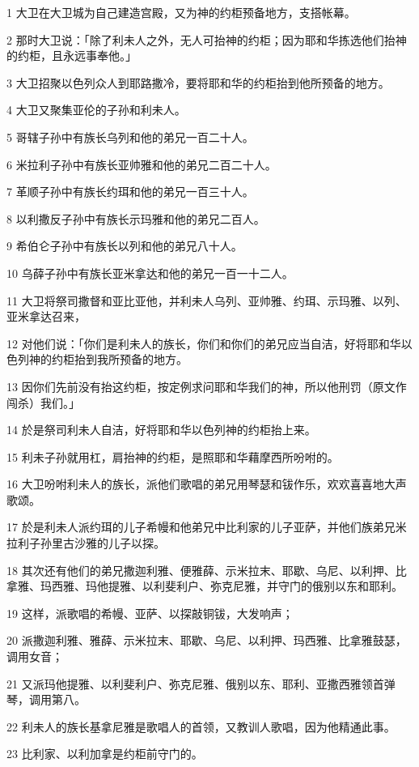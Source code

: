 \par 1 大卫在大卫城为自己建造宫殿，又为神的约柜预备地方，支搭帐幕。
\par 2 那时大卫说：「除了利未人之外，无人可抬神的约柜；因为耶和华拣选他们抬神的约柜，且永远事奉他。」
\par 3 大卫招聚以色列众人到耶路撒冷，要将耶和华的约柜抬到他所预备的地方。
\par 4 大卫又聚集亚伦的子孙和利未人。
\par 5 哥辖子孙中有族长乌列和他的弟兄一百二十人。
\par 6 米拉利子孙中有族长亚帅雅和他的弟兄二百二十人。
\par 7 革顺子孙中有族长约珥和他的弟兄一百三十人。
\par 8 以利撒反子孙中有族长示玛雅和他的弟兄二百人。
\par 9 希伯仑子孙中有族长以列和他的弟兄八十人。
\par 10 乌薛子孙中有族长亚米拿达和他的弟兄一百一十二人。
\par 11 大卫将祭司撒督和亚比亚他，并利未人乌列、亚帅雅、约珥、示玛雅、以列、亚米拿达召来，
\par 12 对他们说：「你们是利未人的族长，你们和你们的弟兄应当自洁，好将耶和华以色列神的约柜抬到我所预备的地方。
\par 13 因你们先前没有抬这约柜，按定例求问耶和华我们的神，所以他刑罚（原文作闯杀）我们。」
\par 14 於是祭司利未人自洁，好将耶和华以色列神的约柜抬上来。
\par 15 利未子孙就用杠，肩抬神的约柜，是照耶和华藉摩西所吩咐的。
\par 16 大卫吩咐利未人的族长，派他们歌唱的弟兄用琴瑟和钹作乐，欢欢喜喜地大声歌颂。
\par 17 於是利未人派约珥的儿子希幔和他弟兄中比利家的儿子亚萨，并他们族弟兄米拉利子孙里古沙雅的儿子以探。
\par 18 其次还有他们的弟兄撒迦利雅、便雅薛、示米拉末、耶歇、乌尼、以利押、比拿雅、玛西雅、玛他提雅、以利斐利户、弥克尼雅，并守门的俄别以东和耶利。
\par 19 这样，派歌唱的希幔、亚萨、以探敲铜钹，大发响声；
\par 20 派撒迦利雅、雅薛、示米拉末、耶歇、乌尼、以利押、玛西雅、比拿雅鼓瑟，调用女音；
\par 21 又派玛他提雅、以利斐利户、弥克尼雅、俄别以东、耶利、亚撒西雅领首弹琴，调用第八。
\par 22 利未人的族长基拿尼雅是歌唱人的首领，又教训人歌唱，因为他精通此事。
\par 23 比利家、以利加拿是约柜前守门的。

